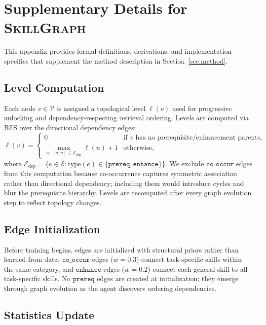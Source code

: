 \appendix
\section{Supplementary Details for \textsc{SkillGraph}}
\label{app:entire_pipeline}

This appendix provides formal definitions, derivations, and implementation specifics that supplement the method description in Section~\ref{sec:method}.

\subsection{Level Computation}
\label{app:level_computation}

Each node $v \in \mathcal{V}$ is assigned a topological level $\ell(v)$ used for progressive unlocking and dependency-respecting retrieval ordering. Levels are computed via BFS over the directional dependency edges:
\begin{equation}
    \ell(v) = \begin{cases} 0 & \text{if } v \text{ has no prerequisite/enhancement parents}, \\ \max_{u: (u,v) \in \mathcal{E}_{\text{dep}}} \ell(u) + 1 & \text{otherwise}, \end{cases}
    \label{eq:level}
\end{equation}
where $\mathcal{E}_{\text{dep}} = \{e \in \mathcal{E} : \text{type}(e) \in \{\texttt{prereq}, \texttt{enhance}\}\}$. We exclude $\texttt{co\_occur}$ edges from this computation because co-occurrence captures symmetric association rather than directional dependency; including them would introduce cycles and blur the prerequisite hierarchy. Levels are recomputed after every graph evolution step to reflect topology changes.

\subsection{Edge Initialization}
\label{app:edge_init}

Before training begins, edges are initialized with structural priors rather than learned from data: $\texttt{co\_occur}$ edges ($w=0.3$) connect task-specific skills within the same category, and $\texttt{enhance}$ edges ($w=0.2$) connect each general skill to all task-specific skills. No $\texttt{prereq}$ edges are created at initialization; they emerge through graph evolution as the agent discovers ordering dependencies.

\subsection{Statistics Update}
\label{app:stats_update}

